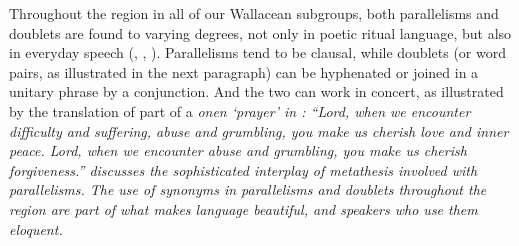 Throughout the region in all of our Wallacean subgroups,
both parallelisms and doublets are found to varying degrees,
not only in poetic ritual language,
but also in everyday speech
(\citealp{Fox1974,Fox1988,Fox2014,Fox2016}, \citealp[15--31]{GrimesTherikGrimesJacob1997}, \citealp[162--164]{TaberTaber2015}).
Parallelisms tend to be clausal,
while doublets (or word pairs, as illustrated in the next paragraph)
can be hyphenated or joined in a
unitary phrase by a conjunction.
And the two can work in concert,
as illustrated by the translation of part of a  \it{onen} ‘prayer’ in
\citet{GrimesBIP}: \it{“Lord,
when we encounter difficulty
and suffering, abuse and grumbling, you make us cherish love and inner peace.
Lord, when we encounter abuse
and grumbling, you make us cherish forgiveness.”}
\citet[379--385]{Edwards2020}
discusses the sophisticated interplay of metathesis involved with  parallelisms.
The use of synonyms in parallelisms
and doublets throughout the region are part of what makes language
beautiful, and speakers who use them eloquent.

